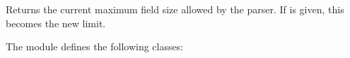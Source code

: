 \documentclass[letterpaper,10pt,english]{sphinxmanual}
\begin{document}

\begin{fulllineitems}
\label{\detokenize{csv:csv.field_size_limit}}
Returns the current maximum field size allowed by the parser. If  is
given, this becomes the new limit.

\end{fulllineitems}


The {\hyperref[\detokenize{csv:module-csv}]{}} module defines the following classes:
\end{document}
